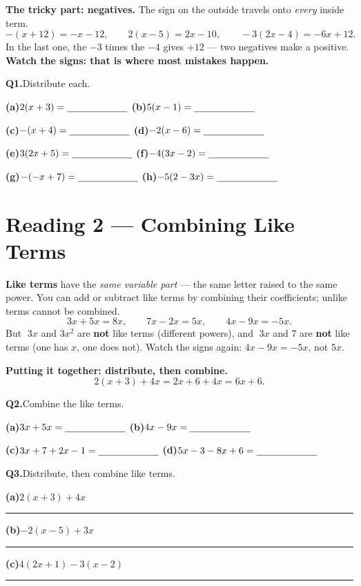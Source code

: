 \documentclass[12pt]{article}
\newcommand{\wl}{\par\vspace{5mm}\noindent\rule{\linewidth}{0.4pt}\par\vspace{1mm}}
\newcommand{\blk}{\rule[-2pt]{2.2cm}{0.4pt}} %
\begin{document}
\textbf{The tricky part: negatives.} The sign on the outside travels onto \emph{every} inside term.
\[
  -(x+12) = -x - 12, \qquad 2(x-5) = 2x - 10, \qquad -3(2x-4) = -6x + 12.
\]
In the last one, the $-3$ times the $-4$ gives $+12$ --- two negatives make a positive. \textbf{Watch the signs:
that is where most mistakes happen.}

\bigskip
\textbf{Q1.}\quad Distribute each. 

\medskip
\textbf{(a)}\quad $2(x+3) = \blk$ \hfill
\textbf{(b)}\quad $5(x-1) = \blk$

\medskip
\textbf{(c)}\quad $-(x+4) = \blk$ \hfill
\textbf{(d)}\quad $-2(x-6) = \blk$

\medskip
\textbf{(e)}\quad $3(2x+5) = \blk$ \hfill
\textbf{(f)}\quad $-4(3x-2) = \blk$

\medskip
\textbf{(g)}\quad $-(-x+7) = \blk$ \hfill
\textbf{(h)}\quad $-5(2-3x) = \blk$

\newpage
\section*{Reading 2 --- Combining Like Terms}
\textbf{Like terms} have the \emph{same variable part} --- the same letter raised to the same power. You can add
or subtract like terms by combining their coefficients; unlike terms cannot be combined.
\[
  3x + 5x = 8x, \qquad 7x - 2x = 5x, \qquad 4x - 9x = -5x.
\]
But $\;3x$ and $3x^2$ are \textbf{not} like terms (different powers), and $\;3x$ and $7$ are \textbf{not} like
terms (one has $x$, one does not). Watch the signs again: $4x - 9x = -5x$, not $5x$.

\textbf{Putting it together: distribute, then combine.}
\[
  2(x+3) + 4x = 2x + 6 + 4x = 6x + 6.
\]

\bigskip
\textbf{Q2.}\quad Combine the like terms.

\medskip
\textbf{(a)}\quad $3x + 5x = \blk$ \hfill
\textbf{(b)}\quad $4x - 9x = \blk$

\medskip
\textbf{(c)}\quad $3x + 7 + 2x - 1 = \blk$ \hfill
\textbf{(d)}\quad $5x - 3 - 8x + 6 = \blk$

\bigskip
\textbf{Q3.}\quad Distribute, then combine like terms.

\medskip
\textbf{(a)}\quad $2(x+3) + 4x$
\wl

\textbf{(b)}\quad $-2(x-5) + 3x$
\wl

\textbf{(c)}\quad $4(2x+1) - 3(x-2)$
\wl
\end{document}

